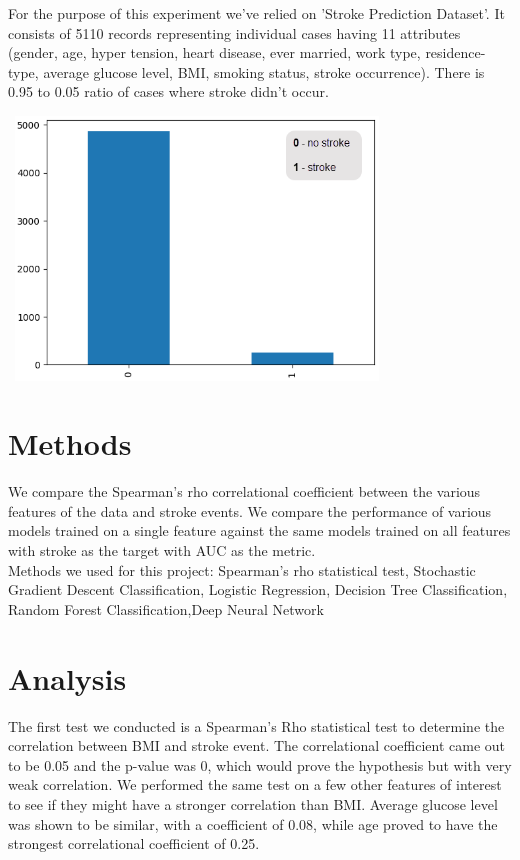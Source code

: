 \documentclass{article}
\begin{document}
For the purpose of this experiment we've relied on 'Stroke Prediction Dataset'. It consists of 5110 records representing individual cases having 11 attributes (gender, age, hyper tension, heart disease, ever married, work type, residence-type, average glucose level, BMI, smoking status, stroke occurrence). There is 0.95 to 0.05 ratio of cases where stroke didn't occur. \\
\begin{center}
\includegraphics[width=10cm, height=7cm]{image/strokevsNostroke.png}
\end{center}

\section{Methods}
We compare the Spearman's rho correlational coefficient between the various features of the data and stroke events.
We compare the performance of various models trained on a single feature against the same models trained on all features with stroke as the target with AUC as the metric.\\

Methods we used for this project:
Spearman's rho statistical test, Stochastic Gradient Descent Classification, Logistic Regression, Decision Tree Classification, Random Forest Classification,Deep Neural Network

\section{Analysis}
The first test we conducted is a Spearman's Rho statistical test to determine the correlation between BMI and stroke event. The correlational coefficient came out to be 0.05 and the p-value was 0, which would prove the hypothesis but with very weak correlation. We performed the same test on a few other features of interest to see if they might have a stronger correlation than BMI. Average glucose level was shown to be similar, with a coefficient of 0.08, while age proved to have the strongest correlational coefficient of 0.25.
\end{document}
